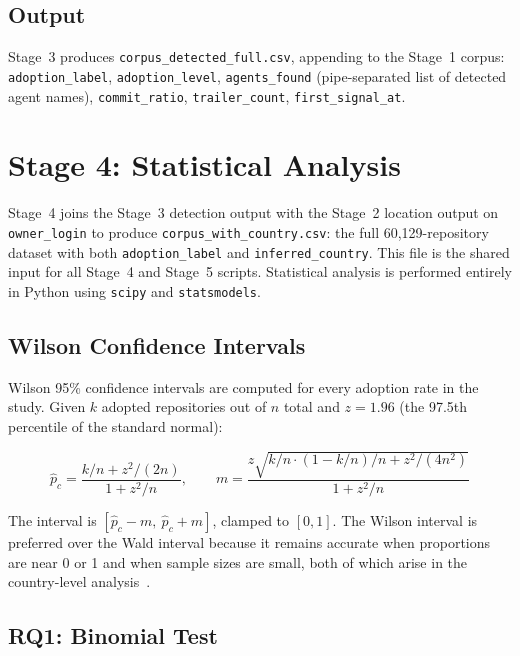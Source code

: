 \subsection{Output}

Stage~3 produces \texttt{corpus\_detected\_full.csv}, appending to the Stage~1 corpus: \texttt{adoption\_label}, \texttt{adoption\_level}, \texttt{agents\_found} (pipe-separated list of detected agent names), \texttt{commit\_ratio}, \texttt{trailer\_count}, \texttt{first\_signal\_at}.

\section{Stage 4: Statistical Analysis}
\label{sec:impl:statistics}

Stage~4 joins the Stage~3 detection output with the Stage~2 location output on \texttt{owner\_login} to produce \texttt{corpus\_with\_country.csv}: the full 60,129-repository dataset with both \texttt{adoption\_label} and \texttt{inferred\_country}. This file is the shared input for all Stage~4 and Stage~5 scripts. Statistical analysis is performed entirely in Python using \texttt{scipy} and \texttt{statsmodels}.

\subsection{Wilson Confidence Intervals}

Wilson 95\% confidence intervals are computed for every adoption rate in the study. Given $k$ adopted repositories out of $n$ total and $z = 1.96$ (the 97.5th percentile of the standard normal):

\[
\hat{p}_c = \frac{k/n + z^2/(2n)}{1 + z^2/n}, \qquad
m = \frac{z\sqrt{k/n \cdot (1 - k/n)/n + z^2/(4n^2)}}{1 + z^2/n}
\]

The interval is $[\hat{p}_c - m,\ \hat{p}_c + m]$, clamped to $[0, 1]$. The Wilson interval is preferred over the Wald interval because it remains accurate when proportions are near 0 or 1 and when sample sizes are small, both of which arise in the country-level analysis~\cite{barke2023}.

\subsection{RQ1: Binomial Test}

